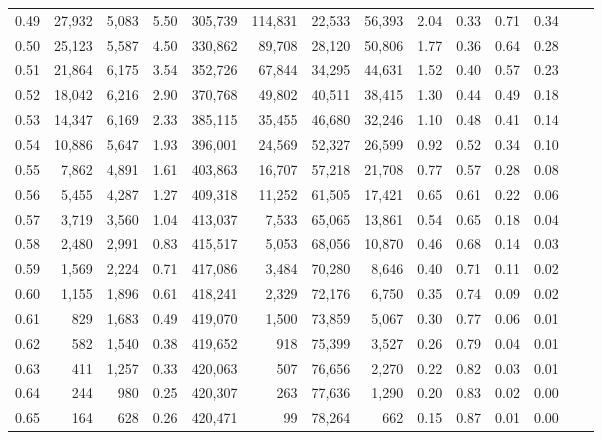 \begin{tabular}{rrrrrrrrrrrrrr}
0.49 &  27,932 &  5,083 &     5.50 &  305,739 &  114,831 &  22,533 &  56,393 &  2.04 &  0.33 &  0.71 &      0.34 \\
0.50 &  25,123 &  5,587 &     4.50 &  330,862 &   89,708 &  28,120 &  50,806 &  1.77 &  0.36 &  0.64 &      0.28 \\
0.51 &  21,864 &  6,175 &     3.54 &  352,726 &   67,844 &  34,295 &  44,631 &  1.52 &  0.40 &  0.57 &      0.23 \\
0.52 &  18,042 &  6,216 &     2.90 &  370,768 &   49,802 &  40,511 &  38,415 &  1.30 &  0.44 &  0.49 &      0.18 \\
0.53 &  14,347 &  6,169 &     2.33 &  385,115 &   35,455 &  46,680 &  32,246 &  1.10 &  0.48 &  0.41 &      0.14 \\
0.54 &  10,886 &  5,647 &     1.93 &  396,001 &   24,569 &  52,327 &  26,599 &  0.92 &  0.52 &  0.34 &      0.10 \\
0.55 &   7,862 &  4,891 &     1.61 &  403,863 &   16,707 &  57,218 &  21,708 &  0.77 &  0.57 &  0.28 &      0.08 \\
0.56 &   5,455 &  4,287 &     1.27 &  409,318 &   11,252 &  61,505 &  17,421 &  0.65 &  0.61 &  0.22 &      0.06 \\
0.57 &   3,719 &  3,560 &     1.04 &  413,037 &    7,533 &  65,065 &  13,861 &  0.54 &  0.65 &  0.18 &      0.04 \\
0.58 &   2,480 &  2,991 &     0.83 &  415,517 &    5,053 &  68,056 &  10,870 &  0.46 &  0.68 &  0.14 &      0.03 \\
0.59 &   1,569 &  2,224 &     0.71 &  417,086 &    3,484 &  70,280 &   8,646 &  0.40 &  0.71 &  0.11 &      0.02 \\
0.60 &   1,155 &  1,896 &     0.61 &  418,241 &    2,329 &  72,176 &   6,750 &  0.35 &  0.74 &  0.09 &      0.02 \\
0.61 &     829 &  1,683 &     0.49 &  419,070 &    1,500 &  73,859 &   5,067 &  0.30 &  0.77 &  0.06 &      0.01 \\
0.62 &     582 &  1,540 &     0.38 &  419,652 &      918 &  75,399 &   3,527 &  0.26 &  0.79 &  0.04 &      0.01 \\
0.63 &     411 &  1,257 &     0.33 &  420,063 &      507 &  76,656 &   2,270 &  0.22 &  0.82 &  0.03 &      0.01 \\
0.64 &     244 &    980 &     0.25 &  420,307 &      263 &  77,636 &   1,290 &  0.20 &  0.83 &  0.02 &      0.00 \\
0.65 &     164 &    628 &     0.26 &  420,471 &       99 &  78,264 &     662 &  0.15 &  0.87 &  0.01 &      0.00 \\

\end{tabular}
